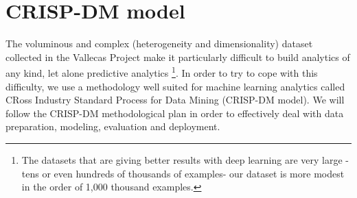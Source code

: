\documentclass[11pt]{article}
\theoremstyle{definition}
\theoremstyle{remark}
\begin{document}
\section{CRISP-DM model}
\label{se:crisp}

 The voluminous and complex (heterogeneity and dimensionality) dataset collected in the Vallecas Project make it particularly difficult to build analytics of any kind, let alone predictive analytics \footnote{The datasets that are giving better results with deep learning are very large -tens or even hundreds of thousands of examples- our dataset is more modest in the order of 1,000 thousand examples.}. In order to try to cope with this difficulty, we use a methodology well suited for machine learning analytics called CRoss Industry Standard Process for Data Mining (CRISP-DM model). We will follow the CRISP-DM methodological plan in order to effectively deal with data preparation, modeling, evaluation and deployment.
  
\end{document}
